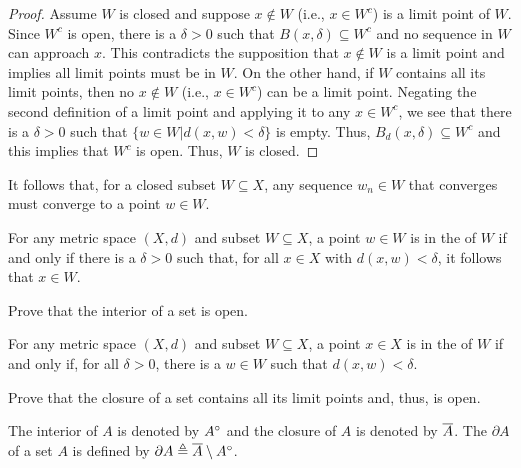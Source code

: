 \begin{proof}
Assume $W$ is closed and suppose $x \notin W$ (i.e., $x \in W^c$) is a limit point of $W$.
Since $W^c$ is open, there is a $\delta > 0$ such that $B(x,\delta) \subseteq W^c$ and no sequence in $W$ can approach $x$. This contradicts the supposition that $x \notin W$ is a limit point and implies all limit points must be in $W$.
On the other hand, if $W$ contains all its limit points, then no $x \notin W$ (i.e., $x\in W^c$) can be a limit point.
Negating the second definition of a limit point and applying it to any $x \in W^c$, we see that there is a $\delta > 0$ such that $\{ w\in W | d(x,w)<\delta \}$ is empty.
Thus, $B_d (x,\delta) \subseteq W^c$ and this implies that $W^c$ is open.
Thus, $W$ is closed.
\end{proof}

It follows that, for a closed subset $W \subseteq X$, any sequence $w_n \in W$ that converges must converge to a point $w \in W$.

\begin{definition}
For any metric space $(X,d)$ and subset $W \subseteq X$, a point $w\in W$ is in the  of $W$ if and only if there is a $\delta >0$ such that, for all $x\in X$ with $d(x,w)<\delta$, it follows that $x\in W$.
\end{definition}

\begin{problem}
Prove that the interior of a set is open.
\end{problem}

\begin{definition}
For any metric space $(X,d)$ and subset $W \subseteq X$, a point $x\in X$ is in the  of $W$ if and only if, for all $\delta >0$, there is a $w\in W$ such that $d(x,w)<\delta$.
\end{definition}

\begin{problem}
Prove that the closure of a set contains all its limit points and, thus, is open.
\end{problem}

The interior of $A$ is denoted by ${A}^{\circ}$ and the closure of $A$ is denoted by $\overline{A}$.
The  $\partial A$ of a set $A$ is defined by $\partial A \triangleq \overline{A} \setminus {A}^{\circ}$.

